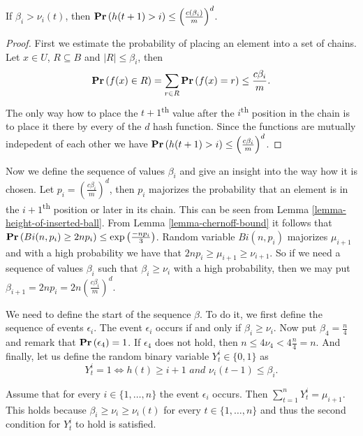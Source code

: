 \begin{lemma}
\label{lemma-height-of-inserted-ball}
If $\beta_i > \nu_i(t)$, then $\mathbf{Pr}\left(h(t + 1) > i\right) \leq \left(\frac{c(\beta_i)}{m}\right) ^ d$.
\end{lemma}
\begin{proof}
First we estimate the probability of placing an element into a set of chains. Let $x \in U$, $R \subseteq B$ and $|R| \leq \beta_i$, then $$\mathbf{Pr}\left(f(x) \in R\right) = \displaystyle\sum_{r \in R} \mathbf{Pr}\left(f(x) = r\right) \leq \frac{c\beta_i}{m} \textit{.}$$
The only way how to place the $t + 1$\textsuperscript{th} value after the $i$\textsuperscript{th} position in the chain is to place it there by every of the $d$ hash function. Since the functions are mutually indepedent of each other we have $\mathbf{Pr}\left(h(t + 1) > i\right) \leq \left(\frac{c \beta_i}{m}\right) ^ d$.
\end{proof}

Now we define the sequence of values $\beta_i$ and give an insight into the way how it is chosen. Let $p_i = \left(\frac{c\beta_i}{m}\right) ^ d$, then $p_i$ majorizes the probability that an element is in the $i + 1$\textsuperscript{th} position or later in its chain. This can be seen from Lemma \ref{lemma-height-of-inserted-ball}. From Lemma \ref{lemma-chernoff-bound} it follows that $\mathbf{Pr}\left(Bi(n, p_i) \geq 2np_i\right) \leq \exp\left(\frac{-np_i}{3}\right)$. Random variable $Bi(n, p_i)$ majorizes $\mu_{i + 1}$ and with a high probability we have that $2np_i \geq \mu_{i + 1} \geq \nu_{i + 1}$. So if we need a sequence of values $\beta_i$ such that $\beta_i \geq \nu_{i}$ with a high probability, then we may put $\beta_{i + 1} = 2np_i = 2n\left(\frac{c\beta_i}{m}\right) ^ d$.

We need to define the start of the sequence $\beta$. To do it, we first define the sequence of events $\epsilon_i$. The event $\epsilon_i$ occurs if and only if $\beta_i \geq \nu_i$. Now put $\beta_4 = \frac{n}{4}$ and remark that $\mathbf{Pr}\left(\epsilon_4\right) = 1$. If $\epsilon_4$ does not hold, then $n \leq 4 \nu_4 < 4 \frac{n}{4} = n$. And finally, let us define the random binary variable $Y_t^i \in \{0, 1\}$ as $$Y_t^i = 1 \Leftrightarrow h(t) \geq i + 1 \textit{ and } \nu_i(t - 1) \leq \beta_i \textit{.}$$

Assume that for every $i \in \{1, \dots, n\}$ the event $\epsilon_i$ occurs. Then $\displaystyle\sum_{t = 1}^{n} Y_t^i = \mu_{i + 1}$. This holds because $\beta_i \geq \nu_i \geq \nu_i(t)$ for every $t \in \{1, \dots, n\}$ and thus the second condition for $Y_t^i$ to hold is satisfied. 


